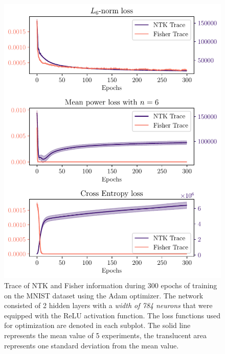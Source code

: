\begin{figure}
	\centering
	\includegraphics{text/results/FisherNTKComparisonPlots/Triple_comparison_losses6_784.pdf}
	\caption{Trace of NTK and Fisher information during 300 epochs of training on the MNIST dataset using the Adam optimizer. The network consisted of 2 hidden layers with a \emph{width of 784 neurons} that were equipped with the ReLU activation function. The loss functions used for optimization are denoted in each subplot. The solid line represents the mean value of 5 experiments, the translucent area represents one standard deviation from the mean value.}
	\label{fig:MNISTTraceComparison5}
\end{figure}